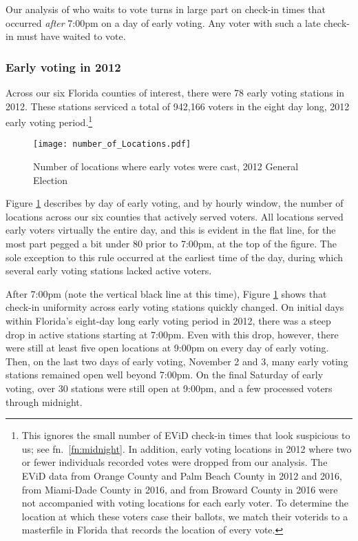 \documentclass[12pt,titlepage]{article}
\begin{document}
Our analysis of who waits to vote turns in large part on check-in
times that occurred \emph{after} 7:00pm on a day of early voting.  Any
voter with such a late check-in must have waited to vote.

\subsubsection*{Early voting in 2012}

Across our six Florida counties of interest, there were 78 early
voting stations in 2012.  These stations serviced a total of 942,166
voters in the eight day long, 2012 early voting period.\footnote{This
  ignores the small number of EViD check-in times that look suspicious
  to us; see fn.\ \ref{fn:midnight}.  In addition, early voting
  locations in 2012 where two or fewer individuals recorded votes were
  dropped from our analysis.  The EViD data from Orange County and
  Palm Beach County in 2012 and 2016, from Miami-Dade County in 2016,
  and from Broward County in 2016 were not accompanied with voting
  locations for each early voter.  To determine the location at which
  these voters case their ballots, we match their voterids to a
  masterfile in Florida that records the location of every
  vote.}  %



\begin{figure}[!ht]
  \caption{Number of locations where early votes were cast, 2012 General Election}
  \label{fig:nrlocs2012}
  \centering
    \centering\texttt{[image: number\_of\_Locations.pdf]}
\end{figure}

Figure \ref{fig:nrlocs2012} describes by day of early voting, and by
hourly window, the number of locations across our six counties that
actively served voters. All locations served early voters virtually
the entire day, and this is evident in the flat line, for the most
part pegged a bit under 80 prior to 7:00pm, at the top of the figure.
The sole exception to this rule occurred at the earliest time of the
day, during which several early voting stations lacked active voters.

After 7:00pm (note the vertical black line at this time), Figure
\ref{fig:nrlocs2012} shows that check-in uniformity across early
voting stations quickly changed.  On initial days within Florida's
eight-day long early voting period in 2012, there was a steep drop in
active stations starting at 7:00pm.  Even with this drop, however,
there were still at least five open locations at 9:00pm on every day
of early voting.  Then, on the last two days of early voting, November
2 and 3, many early voting stations remained open well beyond 7:00pm.
On the final Saturday of early voting, over 30 stations were still
open at 9:00pm, and a few processed voters through midnight.
\end{document}

